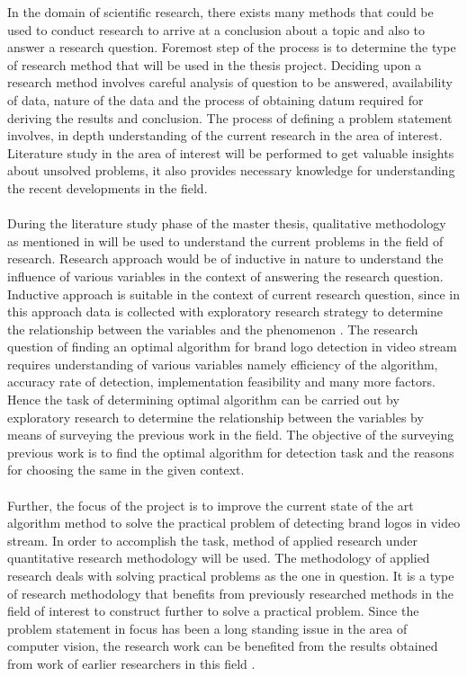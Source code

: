   In the domain of scientific research, there exists many methods that could be used to conduct research to arrive at a conclusion about a topic and also to answer a research question. Foremost step of the process is to determine the type of research method that will be used in the thesis project. Deciding upon a research method involves careful analysis of question to be answered, availability of data, nature of the data and the process of obtaining datum required for deriving the results and conclusion. The process of defining a problem statement involves, in depth understanding of the current research in the area of interest. Literature study in the area of interest will be performed to get valuable insights about unsolved problems, it also provides necessary knowledge for understanding the recent developments in the field. 
  \\ \\
  During the literature study phase of the master thesis, qualitative methodology as mentioned in \cite{haakansson2013portal} will be used to understand the current problems in the field of research. Research approach would be of inductive in nature to understand the influence of various variables in the context of answering the research question. Inductive approach is suitable in the context of current research question, since in this approach data is collected with exploratory research strategy to determine the relationship between the variables and the phenomenon \cite{haakansson2013portal}. The research question of finding an optimal algorithm for brand logo detection in video stream requires understanding of various variables namely efficiency of the algorithm, accuracy rate of detection, implementation feasibility and many more factors. Hence the task of determining optimal algorithm can be carried out by exploratory research to determine the relationship between the variables \cite{haakansson2013portal} by means of surveying the previous work in the field. The objective of the surveying previous work is to find the optimal algorithm for detection task and the reasons for choosing the same in the given context.         
  \\ \\
  Further, the focus of the project is to improve the current state of the art algorithm method to solve the practical problem of detecting brand logos in video stream. In order to accomplish the task, method of applied research under quantitative research methodology \cite{haakansson2013portal} will be used. The methodology of applied research deals with solving practical problems as the one in question. It is a type of research methodology that benefits from previously researched methods in the field of interest to construct further to solve a practical problem. Since the problem statement in focus has been a long standing issue in the area of computer vision, the research work can be benefited from the results obtained from work of earlier researchers in this field \cite{haakansson2013portal}. 
